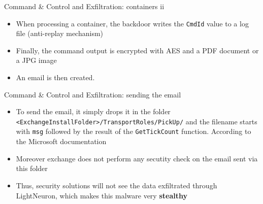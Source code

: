 \begin{frame}[fragile]{Command \& Control and Exfiltration: containers ii}
    \begin{itemize}
        \item When processing a container, the backdoor writes the \texttt{CmdId} value to a log file (anti-replay mechanism)
        \item Finally, the command output is encrypted with AES and a PDF document or a JPG image
        \item An email is then created.
    \end{itemize}

    \begin{figure}
        \centering
        \qquad
    \end{figure}

\end{frame}

\begin{frame}[fragile]{Command \& Control and Exfiltration: sending the email}
    \begin{itemize}
        \item To send the email, it simply drops it in the folder \\\texttt{<ExchangeInstallFolder>/TransportRoles/PickUp/}
        and the filename starts with \texttt{msg} followed by the result of the \texttt{GetTickCount} function. According to the
        Microsoft documentation \cite{MicroSend}
        \item Moreover exchange does not perform any secutity check on the email sent via this folder
        \item Thus, security solutions will not see the data exfiltrated through LightNeuron, which makes this malware
        very \textbf{stealthy}
    \end{itemize}
\end{frame}

